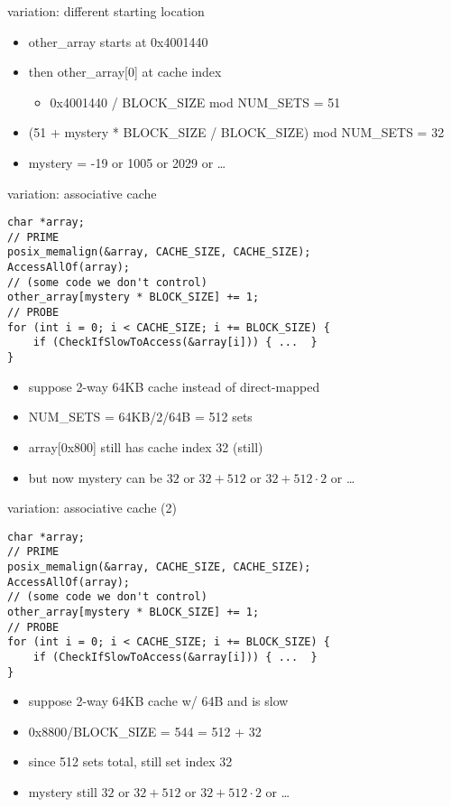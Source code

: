 

\begin{frame}{variation: different starting location}
    \begin{itemize}
    \item other\_array starts at 0x4001440
    \item then other\_array[0] at cache index 
        \begin{itemize}
        \item 0x4001440 / BLOCK\_SIZE mod NUM\_SETS = 51
        \end{itemize}
    \item (51 + mystery * BLOCK\_SIZE / BLOCK\_SIZE) mod NUM\_SETS = 32
    \item mystery = -19 or 1005 or 2029 or \ldots
    \end{itemize}
\end{frame}

\begin{frame}[fragile]{variation: associative cache}
\begin{Verbatim}[fontsize=\fontsize{9}{10}]
char *array;
// PRIME
posix_memalign(&array, CACHE_SIZE, CACHE_SIZE);
AccessAllOf(array);
// (some code we don't control)
other_array[mystery * BLOCK_SIZE] += 1;
// PROBE
for (int i = 0; i < CACHE_SIZE; i += BLOCK_SIZE) {
    if (CheckIfSlowToAccess(&array[i])) { ...  }
}
\end{Verbatim}
    \begin{itemize}
    \item suppose 2-way 64KB cache instead of direct-mapped
    \item NUM\_SETS = 64KB/2/64B = 512 sets
    \item array[0x800] still has cache index 32 (still)
    \item but now mystery can be $32$ or $32+512$ or $32+512\cdot2$ or \ldots
    \end{itemize}
\end{frame}

\begin{frame}[fragile]{variation: associative cache (2)}
\begin{Verbatim}[fontsize=\fontsize{9}{10}]
char *array;
// PRIME
posix_memalign(&array, CACHE_SIZE, CACHE_SIZE);
AccessAllOf(array);
// (some code we don't control)
other_array[mystery * BLOCK_SIZE] += 1;
// PROBE
for (int i = 0; i < CACHE_SIZE; i += BLOCK_SIZE) {
    if (CheckIfSlowToAccess(&array[i])) { ...  }
}
\end{Verbatim}
    \begin{itemize}
    \item suppose 2-way 64KB cache w/ 64B and  is slow
    \item 0x8800/BLOCK\_SIZE = 544 = 512 + 32
    \item since 512 sets total, still set index 32
    \item mystery still $32$ or $32+512$ or $32+512\cdot2$ or \ldots
    \end{itemize}
\end{frame}

